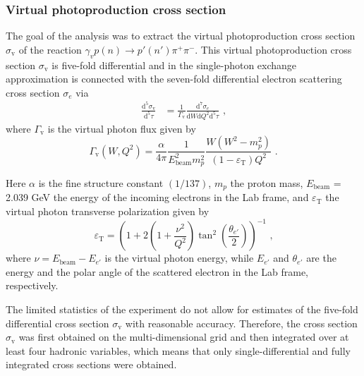 \documentclass[prc,twocolumn,superscriptaddress,showpacs,amssymb,amsmath,amsfonts,aps,nofootinbib]{revtex4-1}
\begin{document}
\subsubsection{Virtual photoproduction cross section}


The goal of the analysis was to extract the virtual photoproduction cross section $\sigma_{\text{v}}$ of the reaction $\gamma_{v}p(n) \rightarrow p'(n') \pi^{+} \pi^{-}$. This virtual photoproduction cross section $\sigma_{\text{v}}$ is five-fold differential and in the single-photon exchange approximation is connected with the seven-fold differential electron scattering cross section $\sigma_{e}$ via 
\begin{equation}
\begin{aligned}
\frac{\textrm{d}^{5}\sigma_{\text{v}}}{\textrm{d}^{5}\tau} &= \frac{1}{\Gamma_{\text{v}}}\frac{\textrm{d}^{7}\sigma_{e}}{\textrm{d}W\textrm{d}Q^{2}\textrm{d}^{5}\tau}  \textrm{ ,}
\end{aligned} 
\label{fulldiff}
\end{equation}
where $\Gamma_{\text{v}}$ is the virtual photon flux given by
\begin{equation}
\Gamma_{\text{v}} (W, Q^2) =
\frac{\alpha}{4\pi}\frac{1}{E_{\text{beam}}^{2}m_{p}^{2}}\frac{W(W^{2}-m_{p}^{2})}
{(1-\varepsilon_{\text{T}})Q^{2}} \textrm{ .}
\label{flux}
\end{equation}

Here $\alpha$ is the fine structure constant $\left(1/137\right)$, $m_{p}$ the proton mass, $E_{\text{beam}}$ = 2.039 GeV the energy of the incoming electrons in the Lab frame, and $\varepsilon_{\text{T}}$ the virtual photon transverse polarization given by 
\begin{equation}
\varepsilon_{\text{T}} = \left( 1 + 2\left( 1 +
\frac{\nu^{2}}{Q^{2}} \right)
\tan^{2}\left(\frac{\theta_{e'}}{2}\right) \right)^{-1} \textrm{ ,}
\label{polarization}
\end{equation}
where $\nu = E_{\text{beam}} - E_{e'}$ is the virtual photon energy, while $E_{e'}$ and $\theta_{e'}$ are the energy and the polar angle of the scattered electron in the Lab frame, respectively. 



The limited statistics of the experiment do not allow for estimates of the five-fold differential cross section $\sigma_{\text{v}}$ with reasonable accuracy. Therefore, the cross section $\sigma_{\text{v}}$ was first obtained on the multi-dimensional grid and then integrated over at least four hadronic variables, which means that only single-differential and fully integrated cross sections were obtained.
\end{document}
